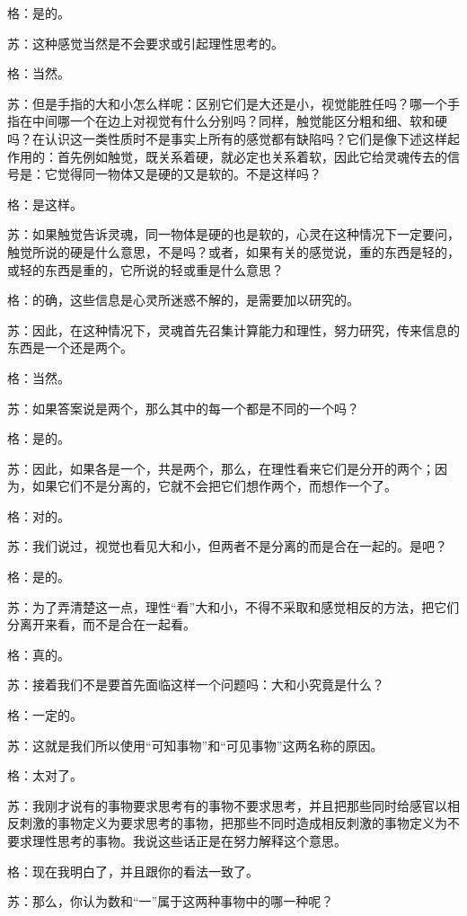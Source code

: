 \documentclass[12pt,oneside]{book}
\begin{document}
格：是的。

苏：这种感觉当然是不会要求或引起理性思考的。

格：当然。

苏：但是手指的大和小怎么样呢：区别它们是大还是小，视觉能胜任吗？哪一个手指在中间哪一个在边上对视觉有什么分别吗？同样，触觉能区分粗和细、软和硬吗？在认识这一类性质时不是事实上所有的感觉都有缺陷吗？它们是像下述这样起作用的：首先例如触觉，既关系着硬，就必定也关系着软，因此它给灵魂传去的信号是：它觉得同一物体又是硬的又是软的。不是这样吗？

格：是这样。

苏：如果触觉告诉灵魂，同一物体是硬的也是软的，心灵在这种情况下一定要问，触觉所说的硬是什么意思，不是吗？或者，如果有关的感觉说，重的东西是轻的，或轻的东西是重的，它所说的轻或重是什么意思？

格：的确，这些信息是心灵所迷惑不解的，是需要加以研究的。

苏：因此，在这种情况下，灵魂首先召集计算能力和理性，努力研究，传来信息的东西是一个还是两个。

格：当然。

苏：如果答案说是两个，那么其中的每一个都是不同的一个吗？

格：是的。

苏：因此，如果各是一个，共是两个，那么，在理性看来它们是分开的两个；因为，如果它们不是分离的，它就不会把它们想作两个，而想作一个了。

格：对的。

苏：我们说过，视觉也看见大和小，但两者不是分离的而是合在一起的。是吧？

格：是的。

苏：为了弄清楚这一点，理性“看”大和小，不得不采取和感觉相反的方法，把它们分离开来看，而不是合在一起看。

格：真的。

苏：接着我们不是要首先面临这样一个问题吗：大和小究竟是什么？

格：一定的。

苏：这就是我们所以使用“可知事物”和“可见事物”这两名称的原因。

格：太对了。

苏：我刚才说有的事物要求思考有的事物不要求思考，并且把那些同时给感官以相反刺激的事物定义为要求思考的事物，把那些不同时造成相反刺激的事物定义为不要求理性思考的事物。我说这些话正是在努力解释这个意思。

格：现在我明白了，并且跟你的看法一致了。

苏：那么，你认为数和“一”属于这两种事物中的哪一种呢？
\end{document}
